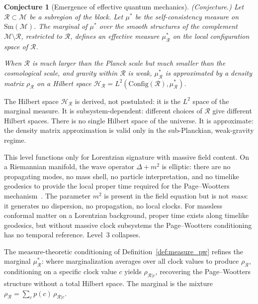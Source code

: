 \documentclass[12pt,a4paper]{article}
\newtheorem{conjecture}{Conjecture}
\theoremstyle{definition}
\theoremstyle{remark}
\begin{document}
\begin{conjecture}[Emergence of effective quantum mechanics]
\emph{(Conjecture.)}
\label{conj:qm}
Let $\mathcal{R} \subset \mathcal{M}$ be a subregion of the block. Let
$\mu^*$ be the self-consistency measure on $\mathrm{Sm}(\mathcal{M})$.
The marginal of $\mu^*$ over the smooth structures of the complement
$\mathcal{M} \setminus \mathcal{R}$, restricted to $\mathcal{R}$, defines
an effective measure $\mu^*_\mathcal{R}$ on the local configuration space
of $\mathcal{R}$.

When $\mathcal{R}$ is much larger than the Planck scale but much smaller
than the cosmological scale, and gravity within $\mathcal{R}$ is weak,
$\mu^*_\mathcal{R}$ is approximated by a density matrix
$\rho_\mathcal{R}$ on a Hilbert space $\mathcal{H}_\mathcal{R} =
L^2(\mathrm{Config}(\mathcal{R}), \mu^*_\mathcal{R})$.
\end{conjecture}

The Hilbert space $\mathcal{H}_\mathcal{R}$ is derived, not
postulated: it is the $L^2$ space of the marginal measure.
It is subsystem-dependent: different choices of $\mathcal{R}$ give
different Hilbert spaces. There is no single Hilbert space of the
universe. It is approximate: the density matrix approximation is valid
only in the sub-Planckian, weak-gravity regime.

This level functions only for Lorentzian signature with massive field
content. On a Riemannian manifold, the wave operator $\Delta + m^2$ is
elliptic: there are no propagating modes, no mass shell, no particle
interpretation, and no timelike geodesics to provide the local proper
time required for the Page--Wootters mechanism~\cite{page_wootters}. The
parameter $m^2$ is present in the field equation but is not
\emph{mass}: it generates no dispersion, no propagation, no local
clocks. For massless conformal matter on a Lorentzian background, proper
time exists along timelike geodesics, but without massive clock
subsystems the Page--Wootters conditioning has no temporal reference.
Level~3 collapses.

The measure-theoretic conditioning of Definition~\ref{def:measure_pw}
refines the marginal $\mu^*_\mathcal{R}$: where marginalization averages
over all clock values to produce $\rho_\mathcal{R}$, conditioning on a
specific clock value $c$ yields $\rho_{\mathcal{R}|c}$, recovering the
Page--Wootters structure without a total Hilbert space. The marginal is the
mixture $\rho_\mathcal{R} = \sum_c p(c)\,\rho_{\mathcal{R}|c}$.
\end{document}
